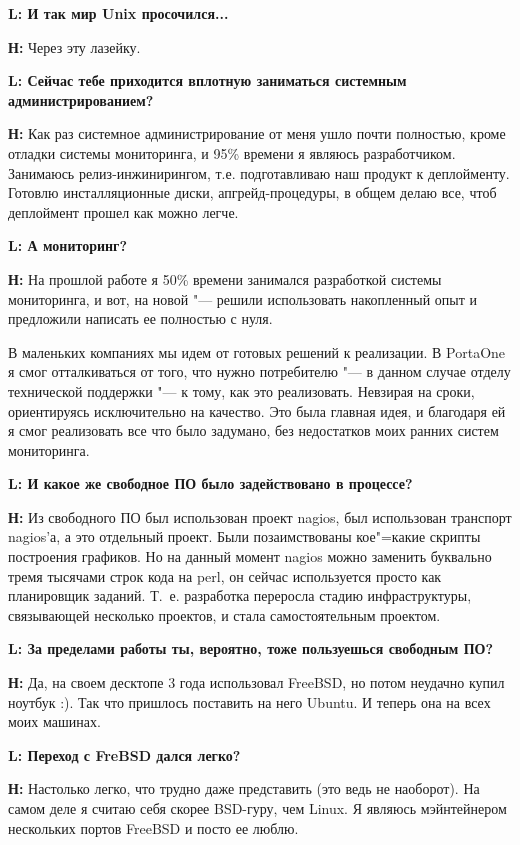 \documentclass[10pt, a5paper]{article}
\begin{document}
{\noindent \bf L: И так мир Unix просочился...}

{\noindent \bf Н:} Через эту лазейку.

{\noindent \bf L: Сейчас тебе приходится вплотную заниматься системным администрированием?}

{\noindent \bf Н:} Как раз системное администрирование от меня ушло почти полностью, кроме отладки системы мониторинга, и 95\% времени я являюсь разработчиком. Занимаюсь релиз-инжинирингом, т.е. подготавливаю наш продукт к деплойменту. Готовлю инсталляционные диски, апгрейд-процедуры, в общем делаю все, чтоб деплоймент прошел как можно легче. 

{\noindent \bf L: А мониторинг?}

{\noindent \bf Н:} На прошлой работе я 50\% времени занимался разработкой системы мониторинга, и вот, на новой "--- решили использовать накопленный опыт и предложили написать ее полностью с нуля.

В маленьких компаниях мы идем от готовых решений к реализации. В PortaOne я смог отталкиваться от того, что нужно потребителю "--- в данном случае отделу технической поддержки "--- к тому, как это реализовать. Невзирая на сроки, ориентируясь исключительно на качество. Это была главная идея, и благодаря ей я смог реализовать все что было задумано, без недостатков моих ранних систем мониторинга.

{\noindent \bf L: И какое же свободное ПО было задействовано в процессе?}

{\noindent \bf Н:} Из свободного ПО был использован проект nagios, был использован транспорт nagios'а, а это отдельный проект. Были позаимствованы кое"=какие скрипты построения графиков. Но на данный момент nagios можно заменить буквально тремя тысячами строк кода на perl, он сейчас используется просто как планировщик заданий. Т.~е. разработка переросла стадию инфраструктуры, связывающей несколько проектов, и стала самостоятельным проектом.

{\noindent \bf L: За пределами работы ты, вероятно, тоже пользуешься свободным ПО?}

{\noindent \bf Н:} Да, на своем десктопе 3 года использовал FreeBSD, но потом неудачно купил ноутбук :). Так что пришлось поставить на него Ubuntu. И теперь она на всех моих машинах.

{\noindent \bf L: Переход с FreBSD дался легко?}

{\noindent \bf Н:} Настолько легко, что трудно даже представить (это ведь не наоборот). На самом деле я считаю себя скорее BSD-гуру, чем Linux. Я являюсь мэйнтейнером нескольких портов FreeBSD и посто ее люблю.
\end{document}
